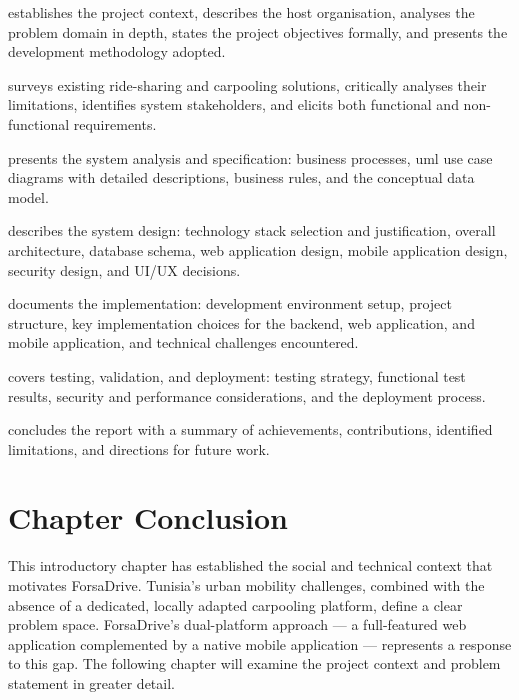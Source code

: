 \documentclass[12pt,a4paper,openright]{report}
\begin{document}
\begin{description}[noitemsep, font=\normalfont\bfseries]
    \item[Chapter 2] establishes the project context, describes the host organisation, analyses the problem domain in depth, states the project objectives formally, and presents the development methodology adopted.
    \item[Chapter 3] surveys existing ride-sharing and carpooling solutions, critically analyses their limitations, identifies system stakeholders, and elicits both functional and non-functional requirements.
    \item[Chapter 4] presents the system analysis and specification: business processes, \gls{uml} use case diagrams with detailed descriptions, business rules, and the conceptual data model.
    \item[Chapter 5] describes the system design: technology stack selection and justification, overall architecture, database schema, web application design, mobile application design, security design, and UI/UX decisions.
    \item[Chapter 6] documents the implementation: development environment setup, project structure, key implementation choices for the backend, web application, and mobile application, and technical challenges encountered.
    \item[Chapter 7] covers testing, validation, and deployment: testing strategy, functional test results, security and performance considerations, and the deployment process.
    \item[Chapter 8] concludes the report with a summary of achievements, contributions, identified limitations, and directions for future work.
\end{description}

\section*{Chapter Conclusion}

This introductory chapter has established the social and technical context that motivates ForsaDrive. Tunisia's urban mobility challenges, combined with the absence of a dedicated, locally adapted carpooling platform, define a clear problem space. ForsaDrive's dual-platform approach --- a full-featured web application complemented by a native mobile application --- represents a response to this gap. The following chapter will examine the project context and problem statement in greater detail.
\end{document}
